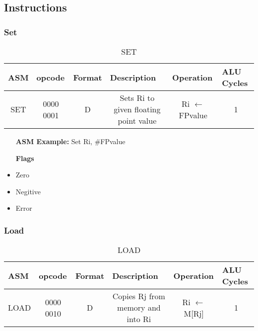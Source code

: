 \documentclass[a4paper,14pt]{article}
\begin{document}
\subsection{Instructions}

\subsubsection{Set}
\begin{table}[h]
\centering
\caption*{SET}
\begin{tabular}{llllll}
ASM & opcode & Format & Description & Operation & ALU Cycles \\ \hline
\multicolumn{1}{|c|}{SET} & \multicolumn{1}{c|}{0000 0001} & \multicolumn{1}{c|}{D} & \multicolumn{1}{c|}{Sets Ri to given floating point value} & \multicolumn{1}{c|}{Ri $\leftarrow$ FPvalue} & \multicolumn{1}{c|}{1} \\ \hline
\end{tabular}
\end{table}

\begin{itemize}
    \setlength{\parskip}{0pt}
    \setlength{\itemsep}{0pt plus 1pt}
    \setlength{\itemindent}{-4mm}
    \item[] \textbf{ASM Example:} Set Ri, \#FPvalue
\end{itemize}
\begin{itemize}
    \setlength{\parskip}{0pt}
    \setlength{\itemsep}{0pt plus 1pt}
    \setlength{\itemindent}{7mm}
    \item [\textbf{Flags}]
    \item Zero
    \item Negitive
    \item Error
\end{itemize}

\subsubsection{Load}
\begin{table}[h]
\centering
\caption*{LOAD}
\begin{tabular}{llllll}
ASM & opcode & Format & Description & Operation & ALU Cycles \\ \hline
\multicolumn{1}{|c|}{LOAD} & \multicolumn{1}{c|}{0000 0010} & \multicolumn{1}{c|}{D} & \multicolumn{1}{c|}{Copies Rj from memory and into Ri} & \multicolumn{1}{c|}{Ri $\leftarrow$ M[Rj]} & \multicolumn{1}{c|}{1} \\ \hline
\end{tabular}
\end{table}
\end{document}
